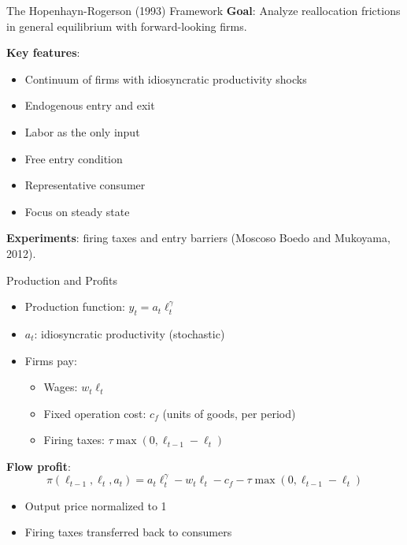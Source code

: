 \documentclass[blue]{beamer}
\begin{document}
\begin{frame}{The Hopenhayn-Rogerson (1993) Framework}
	\textbf{Goal}: Analyze reallocation frictions in general equilibrium with forward-looking firms.
	
	\bigskip
	\textbf{Key features}:
	\begin{itemize}
		\item Continuum of firms with idiosyncratic productivity shocks
		\item Endogenous entry and exit
		\item Labor as the only input
		\item Free entry condition
		\item Representative consumer
		\item Focus on steady state
	\end{itemize}
	
	\bigskip
	\textbf{Experiments}: firing taxes and entry barriers (Moscoso Boedo and Mukoyama, 2012).
\end{frame}

\begin{frame}{Production and Profits}
	\begin{itemize}
		\item Production function: $y_t = a_t \ell_t^\gamma$
		\item $a_t$: idiosyncratic productivity (stochastic)
		\item Firms pay:
		\begin{itemize}
			\item Wages: $w_t \ell_t$
			\item Fixed operation cost: $c_f$ (units of goods, per period)
			\item Firing taxes: $\tau \max(0, \ell_{t-1} - \ell_t)$
		\end{itemize}
	\end{itemize}
	
	\bigskip
	\textbf{Flow profit}:
	\[
	\pi(\ell_{t-1}, \ell_t, a_t) = a_t \ell_t^\gamma - w_t \ell_t - c_f - \tau \max(0, \ell_{t-1} - \ell_t)
	\]
	
	\begin{itemize}
		\item Output price normalized to 1
		\item Firing taxes transferred back to consumers
	\end{itemize}
\end{frame}
\end{document}
